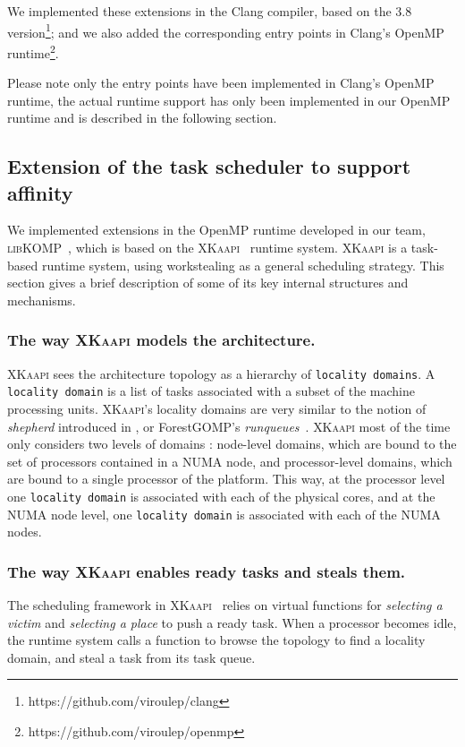 \documentclass{Styles/llncs}
\newcommand{\kaapi}{\textsc{\mbox{XKaapi}}\xspace}
\newcommand{\libXKOMP}{\textsc{libKOMP}\xspace}
\begin{document}
We implemented these extensions in the Clang compiler, based on the 3.8 version\footnote{https://github.com/viroulep/clang}; and we also added the corresponding entry points in Clang's OpenMP runtime\footnote{https://github.com/viroulep/openmp}.

Please note only the entry points have been implemented in Clang's OpenMP runtime, the actual runtime support has only been implemented in our OpenMP runtime and is described in the following section.


\subsection{Extension of the task scheduler to support affinity}

We implemented extensions in the OpenMP runtime developed in our team, \libXKOMP~\cite{Durand2013,libkomp},
which is based on the \kaapi~\cite{Bleuse2014,parco2015} runtime system.
\kaapi is a task-based runtime system, using workstealing as a general scheduling strategy.
This section gives a brief description of some of its key internal structures and mechanisms.

\subsubsection{The way \kaapi models the architecture.}
\kaapi sees the architecture topology as a hierarchy of \verb/locality domains/.
A \verb/locality domain/ is a list of tasks associated with a subset of the machine processing units.
\kaapi's locality domains are very similar to the notion of \emph{shepherd} introduced in \cite{DBLP:journals/ijhpca/OlivierPWSP12}, or ForestGOMP's \emph{runqueues}~\cite{BroFurGogWacNam10IJPP}.
\kaapi most of the time only considers two levels of domains : node-level domains,
which are bound to the set of processors contained in a NUMA node, and processor-level domains, which are bound to a single processor of the platform.
This way, at the processor level one \verb/locality domain/ is associated with each of the physical cores, and
at the NUMA node level, one \verb/locality domain/ is associated with each of the NUMA nodes.


\subsubsection{The way \kaapi enables ready tasks and steals them.}

The scheduling framework in \kaapi~\cite{Bleuse2014,parco2015} relies on virtual functions
for \textit{selecting a victim} and \textit{selecting a place} to push a ready task.
When a processor becomes idle, the runtime system calls a function to browse the topology to find a locality domain, and steal a task from its task queue.
\end{document}
